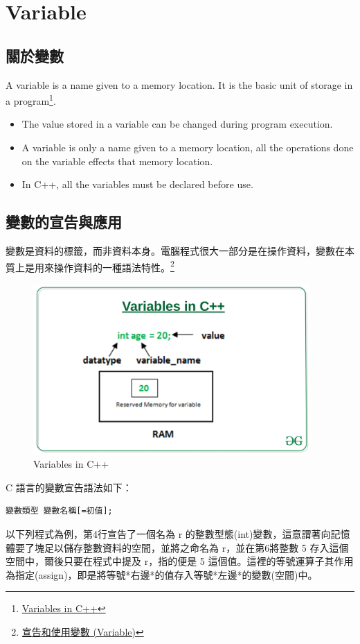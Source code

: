 \documentclass[12pt,a4paper]{article}
\begin{document}
\section{Variable}
\label{cpp_variables}
\subsection{關於變數}
\label{sec:orgdd59134}
A variable is a name given to a memory location. It is the basic unit of storage in a program\footnote{\href{https://www.geeksforgeeks.org/variables-in-c/}{Variables in C++}}.
\begin{itemize}
\item The value stored in a variable can be changed during program execution.
\item A variable is only a name given to a memory location, all the operations done on the variable effects that memory location.
\item In C++, all the variables must be declared before use.
\end{itemize}

\subsection{\label{VarDec}變數的宣告與應用}
\label{sec:orgf96ea5b}
變數是資料的標籤，而非資料本身。電腦程式很大一部分是在操作資料，變數在本質上是用來操作資料的一種語法特性。\footnote{\href{https://michaelchen.tech/c-programming/variable/}{宣告和使用變數 (Variable)}}
\begin{figure}[htbp]
\centering
\includegraphics[width=400]{images/Variables-in-C-1.jpg}
\caption{\label{fig:vic}Variables in C++}
\end{figure}

C 語言的變數宣告語法如下：
\lstset{breaklines=true,language=:eval,label= ,caption= ,captionpos=b,numbers=none}
\begin{lstlisting}
變數類型 變數名稱[=初值];
\end{lstlisting}
以下列程式為例，第4行宣告了一個名為 r 的整數型態(int)變數，這意謂著向記憶體要了塊足以儲存整數資料的空間，並將之命名為 r，並在第6將整數 5 存入這個空間中，爾後只要在程式中提及 r，指的便是 5 這個值。這裡的等號運算子其作用為指定(assign)，即是將等號*右邊*的值存入等號*左邊*的變數(空間)中。
\end{document}
